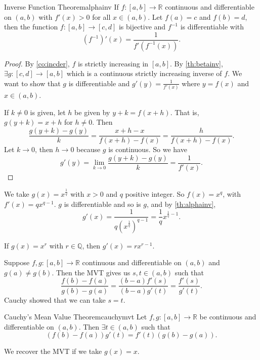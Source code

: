 \begin{theorem}{Inverse Function Theorem}{alphainv}
    If \(f:[a,b]\to\mathbb{R}\) continuous and differentiable on \((a,b)\) with \(f'(x) >0\) for all \(x \in (a,b)\). Let \(f(a) = c\) and \(f(b) = d\), then the function \(f:[a,b]\to[c,d]\) is bijective and \(f^{-1}\) is differentiable with
    \[
        (f^{-1})'(x) = \frac{1}{f'(f^{-1}(x))}.
    \]
\end{theorem}
\begin{proof}
    By \cref{co:incder}, \(f\) is strictly increasing in \([a,b]\). By \cref{th:betainv}, \(\exists g: [c,d] \to [a,b]\) which is a continuous strictly increasing inverse of \(f\). We want to show that \(g\) is differentiable and \(g'(y) = \frac{1}{f'(x)}\) where \(y = f(x)\) and \(x \in (a,b)\).

    If \(k \neq 0\) is given, let \(h\) be given by \(y + k = f(x + h)\). That is, \(g(y + k) = x + h\) for \(h \neq 0\). Then
    \[
        \frac{g(y + k) - g(y)}{k} = \frac{x + h - x}{f(x + h) - f(x)} = \frac{h}{f(x + h) - f(x)}.
    \]
    Let \(k \to 0\), then \(h \to 0\) because \(g\) is continuous. So we have
    \[
        g'(y) = \lim\limits_{k \to 0} \frac{g(y + k) - g(y)}{k} = \frac{1}{f'(x)}.
    \]
\end{proof}
\begin{example}
    We take \(g(x) = x^\frac{1}{q}\) with \(x > 0\) and \(q\) positive integer. So \(f(x) = x^q\), with \(f'(x) = qx^{q-1}\). \(g\) is differentiable and so is \(g\), and by \cref{th:alphainv},
    \[
        g'(x) = \frac{1}{q(x^\frac{1}{q})^{q-1}} = \frac{1}{q}x^{\frac{1}{q} - 1}.
    \]
\end{example}
\begin{remark}
    If \(g(x) = x^r\) with \(r \in \mathbb{Q}\), then \(g'(x) = rx^{r-1}\).
\end{remark}
Suppose \(f,g: [a,b] \to \mathbb{R}\) continuous and differentiable on \((a,b)\) and \(g(a) \neq g(b)\). Then the MVT gives us \(s,t \in (a,b)\) such that
\[
    \frac{f(b) - f(a)}{g(b) - g(a)} = \frac{(b-a)f'(s)}{(b-a)g'(t)}=\frac{f'(s)}{g'(t)}.
\]
Cauchy showed that we can take \(s = t\).
\begin{theorem}{Cauchy's Mean Value Theorem}{cauchymvt}
    Let \(f,g: [a,b] \to \mathbb{R}\) be continuous and differentiable on \((a,b)\). Then \(\exists t \in (a,b)\) such that
    \[
        (f(b) - f(a))g'(t) = f'(t)(g(b) - g(a)).
    \]
\end{theorem}
\begin{remark}
    We recover the MVT if we take \(g(x) = x\).
\end{remark}